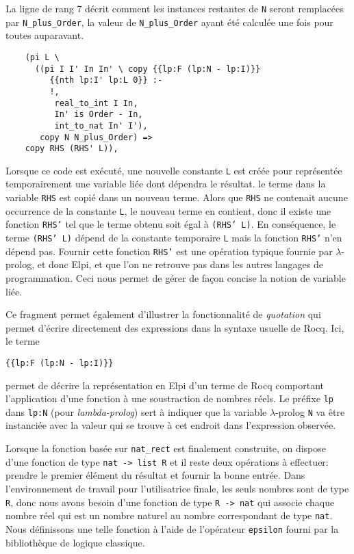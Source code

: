 \documentclass{jflart}
\begin{document}
La ligne de rang 7 décrit comment les instances restantes de \texttt{N} seront
remplacées par \texttt{N\_plus\_Order}, la valeur de
\texttt{N\_plus\_Order} ayant été calculée une fois pour toutes auparavant.
\begin{verbatim}
    (pi L \
      ((pi I I' In In' \ copy {{lp:F (lp:N - lp:I)}}
         {{nth lp:I' lp:L 0}} :-
         !,
          real_to_int I In,
          In' is Order - In,
          int_to_nat In' I'),
       copy N N_plus_Order) =>
    copy RHS (RHS' L)),
\end{verbatim}
Lorsque ce code est exécuté, une nouvelle constante \texttt{L} est créée pour
représentée temporairement une variable liée dont dépendra le résultat.
le terme dans la variable \texttt{RHS} est
copié dans un nouveau terme.  Alors que \texttt{RHS} ne contenait aucune
occurrence de la constante \texttt{L}, le nouveau terme en contient, donc
il existe une fonction \texttt{RHS'} tel que le terme obtenu soit égal
à \texttt{(RHS' L)}.  En conséquence, le terme \texttt{(RHS' L)} dépend de
la constante temporaire \texttt{L} mais la fonction \texttt{RHS'} n'en dépend
pas.  Fournir cette fonction \texttt{RHS'} est une opération
typique fournie par \(\lambda\)-prolog, et donc Elpi, et que l'on ne retrouve
pas dans les autres langages de programmation.  Ceci nous permet de gérer
de façon concise la notion de variable liée.

Ce fragment permet également d'illustrer la fonctionnalité de {\em
  quotation} qui permet d'écrire directement des expressions dans la
syntaxe usuelle de Rocq.  Ici, le terme
\begin{center}
\texttt{\{\{lp:F (lp:N -  lp:I)\}\}}
\end{center}
permet de décrire la représentation en Elpi d'un terme de
Rocq comportant l'application d'une fonction à une soustraction de
nombres réels.  Le préfixe \texttt{lp} dans \texttt{lp:N}
(pour \textit{lambda-prolog}) sert à indiquer que la variable \(\lambda\)-prolog
\texttt{N} va être instanciée avec la valeur qui se trouve à cet endroit dans
l'expression observée.

Lorsque la fonction basée sur \texttt{nat\_rect} est finalement
construite, on dispose d'une fonction de type \texttt{nat -> list R} et il
reste deux opérations à effectuer: prendre le premier élément du
résultat et fournir la bonne entrée.  Dans l'environnement de travail
pour l'utilisatrice finale, les seuls nombres sont de type \texttt{R},
donc nous avons besoin d'une fonction de type \texttt{R -> nat} qui
associe chaque nombre réel qui est un nombre naturel au nombre
correspondant de type \texttt{nat}.  Nous définissons une telle fonction
à l'aide de l'opérateur \texttt{epsilon} fourni par la bibliothèque de
logique classique.
\end{document}
